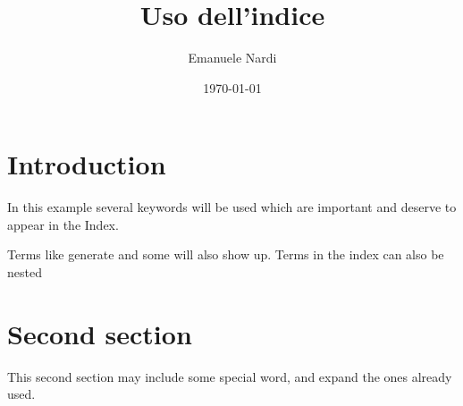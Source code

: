 \documentclass{article}
\title{Uso dell'indice}
\author{Emanuele Nardi}
\date{\today}
\begin{document}
\maketitle

\tableofcontents

\section{Introduction}
In this example several keywords will be used
which are important and deserve to appear in the Index.

Terms like generate and some will also
show up. Terms in the index can also be nested 

\section{Second section}
This second section may include some special word,
and expand the ones already used.

\printindex
\end{document}
